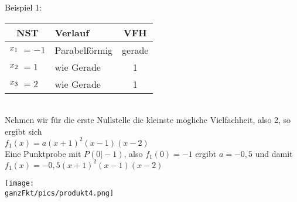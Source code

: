 \begin{minipage}{\linewidth}
	{\color{loes}\begin{minipage}{0.5\linewidth}
			\textcolor{black}{Beispiel 1:}\\
			\begin{tabular}{rllc}
				\multicolumn{2}{c}{NST}&Verlauf&VFH\\
				\midrule
				\(x_1\hspace{-0.3cm}\)&\(=-1\)&Parabelförmig&gerade\\
				\(x_2\hspace{-0.3cm}\)&\(=1\)&wie Gerade&1\\
				\(x_3\hspace{-0.3cm}\)&\(=2\)&wie Gerade&1
			\end{tabular}\\
			Nehmen wir für die erste Nullstelle die kleinste mögliche Vielfachheit, also 2, so ergibt sich\\
			\(f_1(x)=a\left(x+1\right)^2 \left(x-1\right) \left(x-2\right) \)\\
			Eine Punktprobe mit \(P(0\vert-1)\), also \(f_1(0)=-1\) ergibt \(a=-0,5\) und damit\\
			\(f_1(x)=-0,5\left(x+1\right)^2 \left(x-1\right) \left(x-2\right) \)
	\end{minipage}}
	\begin{minipage}{0.5\linewidth}
		\texttt{[image: \\ganzFkt/pics/produkt4.png]}
	\end{minipage}
\end{minipage}\\ \vspace{.15cm}\\
